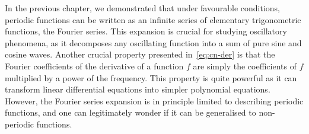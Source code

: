In the previous chapter, we demonstrated that under favourable conditions, periodic
functions can be written as an infinite series of elementary trigonometric functions, the
Fourier series. This expansion is crucial for studying oscillatory phenomena, as it
decomposes any oscillating function into a sum of pure sine and cosine waves. Another
crucial property presented in~\cref{eq:cn-der} is that the Fourier coefficients of the
derivative of a function $f$ are simply the coefficients of $f$ multiplied by a power of
the frequency. This property is quite powerful as it can transform linear differential
equations into simpler polynomial equations. However, the Fourier series expansion is in
principle limited to describing periodic functions, and one can legitimately wonder if it
can be generalised to non-periodic functions.

